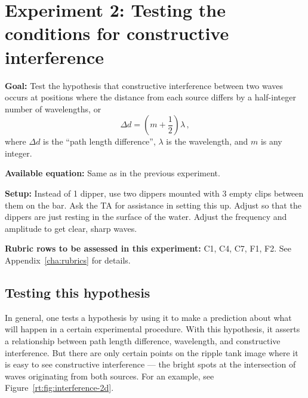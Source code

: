 \section{Experiment 2: Testing the conditions for constructive interference}

\textbf{Goal:} Test the hypothesis that constructive interference between two waves occurs at positions where the distance from each source differs by a half-integer number of wavelengths, or
\begin{equation}
 \Delta d = (m+\frac{1}{2})\lambda \,,
\end{equation}
where $\Delta d$ is the ``path length difference'', $\lambda$ is the wavelength, and $m$ is any integer.

\textbf{Available equation:} Same as in the previous experiment.

\textbf{Setup:} Instead of 1 dipper, use two dippers mounted with 3 empty clips between them on the bar. Ask the TA for assistance in setting this up. Adjust so that the dippers are just resting in the surface of the water. Adjust the frequency and amplitude to get clear, sharp waves.

\textbf{Rubric rows to be assessed in this experiment:} C1, C4, C7, F1, F2. See Appendix~\ref{cha:rubrics} for details.

\subsection{Testing this hypothesis}

In general, one tests a hypothesis by using it to make a prediction about what will happen in a certain experimental procedure. With this hypothesis, it asserts a relationship between path length difference, wavelength, and constructive interference. But there are only certain points on the ripple tank image where it is easy to see constructive interference --- the bright spots at the intersection of waves originating from both sources. For an example, see Figure~\ref{rt:fig:interference-2d}.

